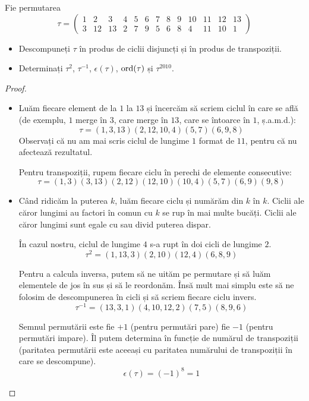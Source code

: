 \begin{exercise}
Fie permutarea
\[
\tau = \begin{pmatrix}
1 & 2 & 3 & 4 & 5 & 6 & 7 & 8 & 9 & 10 & 11 & 12 & 13 \\
3 & 12 & 13 & 2 & 7 & 9 & 5 & 6 & 8 & 4 & 11 & 10 & 1
\end{pmatrix}
\]
\begin{itemize}
    \item Descompuneți \(\tau\) în produs de ciclii disjuncți și în produs de transpoziții.
    \item Determinați \(\tau^2\), \(\tau^{-1}\), \(\epsilon(\tau)\), \(\operatorname{ord}(\tau)\) și \(\tau^{2010}\).
\end{itemize}
\end{exercise}
\begin{proof}
~
\begin{itemize}
    \item Luăm fiecare element de la \(1\) la \(13\) și încercăm să scriem ciclul în care se află (de exemplu, \(1\) merge în \(3\), care merge în \(13\), care se întoarce în \(1\), ș.a.m.d.):
    \[
        \tau = (1, 3, 13) (2, 12, 10, 4) (5, 7) (6, 9, 8)
    \]
    Observați că nu am mai scris ciclul de lungime \(1\) format de \(11\), pentru că nu afectează rezultatul.
    
    Pentru transpoziții, rupem fiecare ciclu în perechi de elemente consecutive:
    \[
        \tau = (1, 3) (3, 13) (2, 12) (12, 10) (10, 4) (5, 7) (6, 9) (9, 8)
    \]
    
    \item Când ridicăm la puterea \(k\), luăm fiecare ciclu și numărăm din \(k\) în \(k\). Ciclii ale căror lungimi au factori în comun cu \(k\) se rup în mai multe bucăți. Ciclii ale căror lungimi sunt egale cu sau divid puterea dispar.
    
    În cazul nostru, ciclul de lungime \(4\) s-a rupt în doi cicli de lungime \(2\).
    \[
        \tau^2 = (1, 13, 3) (2, 10) (12, 4) (6, 8, 9)
    \]
    
    Pentru a calcula inversa, putem să ne uităm pe permutare și să luăm elementele de jos în sus și să le reordonăm. Însă mult mai simplu este să ne folosim de descompunerea în cicli și să scriem fiecare ciclu invers.
    \[
        \tau^{-1} = (13, 3, 1) (4, 10, 12, 2) (7, 5) (8, 9, 6)
    \]
    
    Semnul permutării este fie \(+1\) (pentru permutări pare) fie \(-1\) (pentru permutări impare). Îl putem determina în funcție de numărul de transpoziții (paritatea permutării este aceeași cu paritatea numărului de transpoziții în care se descompune).
    \[
        \epsilon(\tau) = (-1)^{8} = 1
    \]
    

\end{itemize}
\end{proof}
